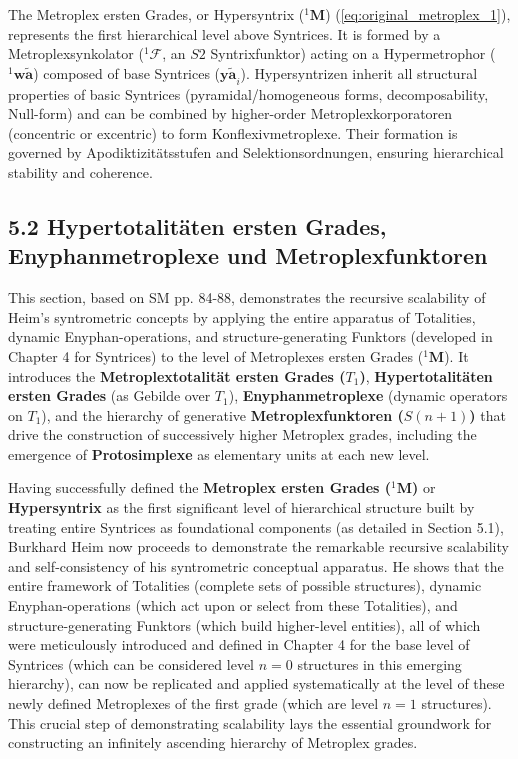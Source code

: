 \documentclass[12pt]{article}
\newcommand{\syntrix}{\bm{y\widetilde{a}}}
\newcommand{\metroplex}[1]{{}^{#1}\mathbf{M}}
\newcommand{\hypersyntrix}{\metroplex{1}}
\newcommand{\hypermetrophor}[1]{{}^{#1}\mathbf{w\widetilde{a}}}
\newcommand{\metroplexsynkolator}[1]{{}^{#1}\mathcal{F}}
\newcommand{\metroplextotalitaet}[1]{T_{#1}}
\newcommand{\metroplexfunktor}{S}
\begin{document}
The Metroplex ersten Grades, or Hypersyntrix (\(\hypersyntrix\)) (\eqref{eq:original_metroplex_1}), represents the first hierarchical level above Syntrices. It is formed by a Metroplexsynkolator (\(\metroplexsynkolator{1}\), an \(S2\) Syntrixfunktor) acting on a Hypermetrophor (\(\hypermetrophor{1}\)) composed of base Syntrices (\(\syntrix_i\)). Hypersyntrizen inherit all structural properties of basic Syntrices (pyramidal/homogeneous forms, decomposability, Null-form) and can be combined by higher-order Metroplexkorporatoren (concentric or excentric) to form Konflexivmetroplexe. Their formation is governed by Apodiktizitätsstufen and Selektionsordnungen, ensuring hierarchical stability and coherence.

\subsection{5.2 Hypertotalitäten ersten Grades, Enyphanmetroplexe und Metroplexfunktoren}
\label{sec:hypertotalitaeten}

This section, based on SM pp. 84-88, demonstrates the recursive scalability of Heim's syntrometric concepts by applying the entire apparatus of Totalities, dynamic Enyphan-operations, and structure-generating Funktors (developed in Chapter 4 for Syntrices) to the level of Metroplexes ersten Grades (\(\hypersyntrix\)). It introduces the \textbf{Metroplextotalität ersten Grades (\(\metroplextotalitaet{1}\))}, \textbf{Hypertotalitäten ersten Grades} (as Gebilde over \( \metroplextotalitaet{1} \)), \textbf{Enyphanmetroplexe} (dynamic operators on \( \metroplextotalitaet{1} \)), and the hierarchy of generative \textbf{Metroplexfunktoren (\(\metroplexfunktor(n+1)\))} that drive the construction of successively higher Metroplex grades, including the emergence of \textbf{Protosimplexe} as elementary units at each new level.

Having successfully defined the \textbf{Metroplex ersten Grades (\( \hypersyntrix \))} or \textbf{Hypersyntrix} as the first significant level of hierarchical structure built by treating entire Syntrices as foundational components (as detailed in Section 5.1), Burkhard Heim now proceeds to demonstrate the remarkable recursive scalability and self-consistency of his syntrometric conceptual apparatus. He shows that the entire framework of Totalities (complete sets of possible structures), dynamic Enyphan-operations (which act upon or select from these Totalities), and structure-generating Funktors (which build higher-level entities), all of which were meticulously introduced and defined in Chapter 4 for the base level of Syntrices (which can be considered level \( n=0 \) structures in this emerging hierarchy), can now be replicated and applied systematically at the level of these newly defined Metroplexes of the first grade (which are level \( n=1 \) structures). This crucial step of demonstrating scalability lays the essential groundwork for constructing an infinitely ascending hierarchy of Metroplex grades.
\end{document}
